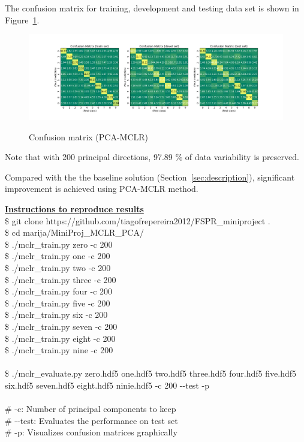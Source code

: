 \documentclass[a4paper,10pt,fleqn]{article}
\newcommand{\note}[1]{
\begin{boxitpara}{}%
\textbf{\underline{Instructions to reproduce results}} #1
\end{boxitpara}}
\begin{document}
The confusion matrix for training, development and testing data set is shown in Figure~\ref{fig:pca_mclr}.
\begin{figure}[htbf]
  \caption{Confusion matrix (PCA-MCLR)}
  \centering \includegraphics[width=\textwidth,height=0.3\textwidth]{Figures/mclr_pca200}
  \label{fig:pca_mclr}
\end{figure}

Note that with 200 principal directions,  97.89 \% of data variability is preserved.

Compared with the the baseline solution (Section~\ref{sec:description}), significant improvement is achieved using PCA-MCLR method.

\note{\\ 
	\$ git clone https://github.com/tiagofrepereira2012/FSPR\_miniproject . \\
	\$ cd marija/MiniProj\_MCLR\_PCA/ \\
\$ ./mclr\_train.py zero -c 200 \\
\$ ./mclr\_train.py one -c 200 \\
\$ ./mclr\_train.py two -c 200 \\
\$ ./mclr\_train.py three -c 200 \\
\$ ./mclr\_train.py four -c 200 \\
\$ ./mclr\_train.py five -c 200 \\
\$ ./mclr\_train.py six -c 200 \\
\$ ./mclr\_train.py seven -c 200 \\
\$ ./mclr\_train.py eight -c 200 \\
\$ ./mclr\_train.py nine -c 200 \\\\
\$ ./mclr\_evaluate.py zero.hdf5 one.hdf5 two.hdf5 three.hdf5 four.hdf5 five.hdf5 six.hdf5 seven.hdf5 eight.hdf5 ninie.hdf5 -c 200 -{}-test -p\\\\
\# -c: Number of principal components to keep\\
\# -{}-test: Evaluates the performance on test set\\
\# -p: Visualizes confusion matrices graphically
}
\end{document}
